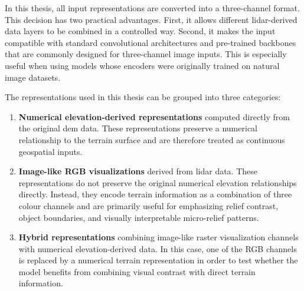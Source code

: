 In this thesis, all input representations are converted into a three-channel format. This decision has two practical advantages. First, it allows different \gls{lidar}-derived data layers to be combined in a controlled way. Second, it makes the input compatible with standard convolutional architectures and pre-trained backbones that are commonly designed for three-channel image inputs. This is especially useful when using models whose encoders were originally trained on natural image datasets.

The representations used in this thesis can be grouped into three categories:
\begin{enumerate}
    \item \textbf{Numerical elevation-derived representations} computed directly from the original \gls{dem} data. These representations preserve a numerical relationship to the terrain surface and are therefore treated as continuous geospatial inputs.

    \item \textbf{Image-like RGB visualizations} derived from \gls{lidar} data. These representations do not preserve the original numerical elevation relationships directly. Instead, they encode terrain information as a combination of three colour channels and are primarily useful for emphasizing relief contrast, object boundaries, and visually interpretable micro-relief patterns.

    \item \textbf{Hybrid representations} combining image-like raster visualization channels with numerical elevation-derived data. In this case, one of the RGB channels is replaced by a numerical terrain representation in order to test whether the model benefits from combining visual contrast with direct terrain information.
\end{enumerate}

